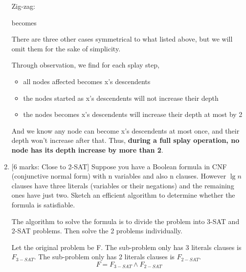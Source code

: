 \documentclass[12pt]{article}
\begin{document}
\begin{enumerate}
\begin{center}
Zig-zag:
becomes
\end{center}

There are three other cases symmetrical to what listed above, but we will omit them for the sake of simplicity.

Through observation, we find for each splay step,
\begin{itemize}
\item all nodes affected becomes x's descendents
\item the nodes started as x's descendents will not increase their depth
\item the nodes becomes x's descendents will increase their depth at most by 2
\end{itemize}

And we know any node can become x's descendents at most once, and their depth won't increase after that. Thus, \textbf{during a full splay operation, no node has its depth increase by more than 2}.

\medskip

\item{} [6 marks: Close to 2-SAT]
Suppose you have a Boolean formula in CNF (conjunctive normal form) with n variables and also n clauses. However $\lg{n}$ clauses have three literals (variables or their negations) and the remaining ones have just two. Sketch an efficient algorithm to determine whether the formula is satisfiable.

The algorithm to solve the formula is to divide the problem into 3-SAT and 2-SAT problems. Then solve the 2 problems individually.

Let the original problem be F. The sub-problem only has 3 literals clauses is $F_{3-SAT}$. The sub-problem only has 2 literals clauses is $F_{2-SAT}$.
\begin{equation}
F = F_{3-SAT} \land F_{2-SAT}
\end{equation}


\end{enumerate}
\end{document}
